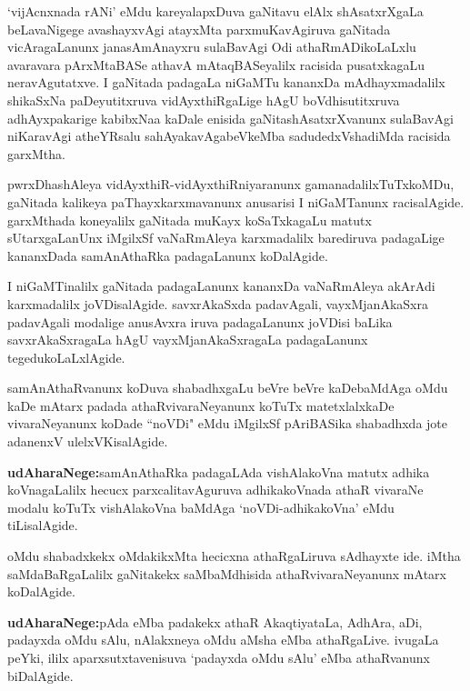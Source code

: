 `vijAcnxnada rANi' eMdu kareyalapxDuva gaNitavu elAlx shAsatxrXgaLa beLavaNigege avashayxvAgi atayxMta parxmuKavAgiruva gaNitada vicAragaLanunx janasAmAnayxru sulaBavAgi Odi athaRmADikoLaLxlu avaravara pArxMtaBASe athavA mAtaqBASeyalilx racisida pusatxkagaLu neravAgutatxve. I gaNitada padagaLa niGaMTu kananxDa mAdhayx\-madalilx shikaSxNa paDeyutitxruva vidAyxthiRgaLige hAgU boVdhisutitxruva adhAyxpakarige kabibxNaa kaDale enisida gaNitashAsatxrXvanunx sulaBavAgi niKaravAgi atheYRsalu sahAyakavAgabeVkeMba sadudedxVshadiMda racisida garxMtha.

pwrxDhashAleya vidAyxthiR-vidAyxthiRniyaranunx gamanadalilxTuTxkoMDu, gaNitada kalikeya paThayxkarxmavanunx anusarisi I niGaMTanunx racisalAgide. garxMthada koneyalilx gaNitada muKayx koSaTxkagaLu matutx sUtarxgaLanUnx iMgilxSf vaNaRmAleya karxmadalilx barediruva padagaLige kananxDada samAnAthaRka padagaLanunx koDalAgide.

I niGaMTinalilx gaNitada padagaLanunx kananxDa vaNaRmAleya akArAdi karxmadalilx joVDisalAgide. savxrAkaSxda padavAgali, vayxMjanAkaSxra padavAgali modalige anusAvxra iruva padagaLanunx joVDisi baLika savxrAkaSxragaLa hAgU vayxMjanAkaSxragaLa padagaLanunx tegedukoLaLxlAgide.

samAnAthaRvanunx koDuva shabadhxgaLu beVre beVre kaDebaMdAga oMdu kaDe mAtarx padada athaRvivaraNeyanunx koTuTx matetxlalxkaDe vivaraNeyanunx koDade ``noVDi" eMdu iMgilxSf pAriBASika shabadhxda jote adanenxV ulelxVKisalAgide.

\textbf{udAharaNege:}\quad samAnAthaRka padagaLAda vishAlakoVna matutx adhika koVnagaLalilx hecucx parxcalitavAguruva adhikakoVnada athaR vivaraNe modalu koTuTx vishAlakoVna baMdAga `noVDi-adhikakoVna' eMdu tiLisalAgide.

oMdu shabadxkekx oMdakikxMta hecicxna athaRgaLiruva sAdhayxte ide. iMtha saMdaBaRgaLalilx gaNitakekx saMbaMdhisida athaRvivaraNeyanunx mAtarx koDalAgide.

\textbf{udAharaNege:}\quad pAda eMba padakekx athaR AkaqtiyataLa, AdhAra, aDi, padayxda oMdu sAlu, nAlakxneya oMdu aMsha eMba athaRgaLive. ivugaLa peYki, ililx aparxsutxtavenisuva `padayxda oMdu sAlu' eMba athaRvanunx biDalAgide.

\newpage

